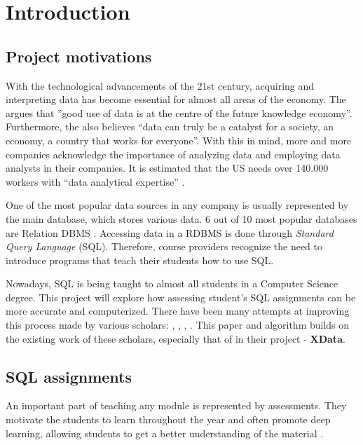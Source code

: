 \chapter{Introduction} \label{ch:introduction}
\section{Project motivations}
With the technological advancements of the 21st century, acquiring and interpreting
data has become essential for almost all areas of the economy. The \cite{ec:big_data} argues that ''good use of data is at
the centre of the future knowledge economy''.
Furthermore, the \cite{gov:big_data} also believes ``data can truly be a catalyst for a society, an economy, a country that works for everyone''. With this in mind, more and more companies acknowledge the importance of analyzing data and employing data analysts in their companies. It is estimated that the US needs over 140.000 workers with ``data analytical expertise'' \citep{Lohr2012}.

One of the most popular data sources in any company is usually represented by the main database, which stores various data. 6 out of 10 most popular databases are Relation DBMS \citep{db_engine:statistics}.
Accessing data in a RDBMS is done through \textit{Standard Query Language}
(SQL). Therefore, course providers recognize the need to introduce programs that teach their students how to use SQL.

Nowadays, SQL is being taught to almost all students in a Computer Science
degree. This project will explore how assessing student's SQL
assignments can be more accurate and computerized. There have been many attempts at improving this process made by various scholars: \cite{literature:activesql}, \cite{literature:assesql},
\cite{literature:sqlify}, \cite{literature:xdata}. This paper and algorithm builds on the existing work of these scholars, especially that of \cite{literature:xdata} in their project - \textbf{XData}.

\section{SQL assignments} \label{ch:introduction:assignments}

An important part of teaching any module is represented by assessments. They motivate the students to learn throughout the year and often promote deep learning, allowing students to get a better understanding of the material \citep{literature:assement}.

